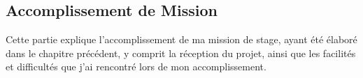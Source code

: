 
\begin{coverpage}
  \chapter{Accomplissement de Mission}

  Cette partie explique l'accomplissement
  de ma mission de stage, ayant été élaboré
  dans le chapitre précédent, y comprit la
  réception du projet, ainsi que les facilités
  et difficultés que j'ai rencontré lors de mon
  accomplissement.
\end{coverpage}
